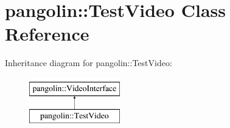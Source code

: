 \hypertarget{classpangolin_1_1_test_video}{}\section{pangolin\+:\+:Test\+Video Class Reference}
\label{classpangolin_1_1_test_video}
Inheritance diagram for pangolin\+:\+:Test\+Video\+:\begin{figure}[H]
\begin{center}
\leavevmode
\includegraphics[height=2.000000cm]{classpangolin_1_1_test_video}
\end{center}
\end{figure}

